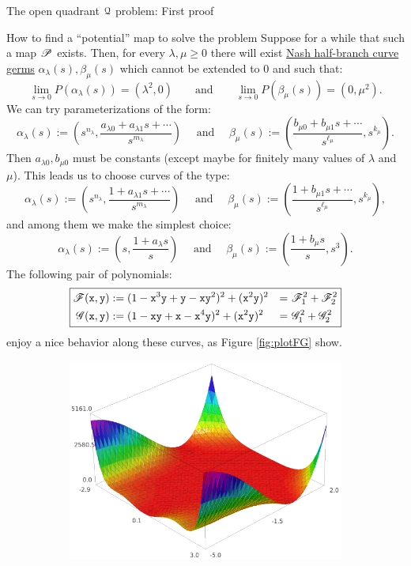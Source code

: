 \documentclass[11pt, a4paper, english, twoside, notitlepage, openright]{report}
\begin{document}
\begin{chapter}{The open quadrant $\Qu$ problem: First proof}
\begin{section}{How to find a ``potential'' map to solve the problem}
Suppose for a while that such a map $\P$ exists. Then, for every $\lambda,\mu\ge 0$ there will exist \hyperref[curveGerms]{Nash half-branch curve germs} $\alpha_{\lambda}(s),\beta_{\mu}(s)$ which cannot be extended to $0$ and such that:
$$
\lim_{s\rightarrow 0} P(\alpha_{\lambda}(s))=(\lambda^2,0)\qquad \text{and} \qquad \lim_{s\rightarrow 0} P(\beta_{\mu}(s))=(0,\mu^2).
$$
We can try parameterizations of the form:
$$
\alpha_{\lambda}(s):=\left(s^{n_{\lambda}},\frac{a_{\lambda 0}+a_{\lambda 1}s+\cdots}{s^{m_{\lambda}}}\right)
\quad \text{ and } \quad
\beta_{\mu}(s):=\left(\frac{b_{\mu 0}+b_{\mu 1}s+\cdots}{s^{\ell_{\mu}}},s^{k_{\mu}}\right).
$$
Then $a_{\lambda 0},b_{\mu 0}$ must be constants (except maybe for finitely many values of $\lambda$ and $\mu$). This leads us to choose curves of the type:
$$
\alpha_{\lambda}(s):=\left(s^{n_{\lambda}},\frac{1+a_{\lambda 1}s+\cdots}{s^{m_{\lambda}}}\right)
\quad \text{ and } \quad
\beta_{\mu}(s):=\left(\frac{1+b_{\mu 1}s+\cdots}{s^{\ell_{\mu}}},s^{k_{\mu}}\right),
$$
and among them we make the simplest choice: 
$$
\alpha_{\lambda}(s):=\left(s,\frac{1+a_{\lambda }s}{s}\right)
\quad \text{ and } \quad
\beta_{\mu}(s):=\left(\frac{1+b_{\mu }s}{s},s^{3}\right).
$$
The following pair of polynomials:
\begin{equation*}\label{eq:firstMap}
\boxed{
\begin{aligned}
\F({\tt x},{\tt y})&:=(1-{\tt x}^3{\tt y}+{\tt y}-{\tt x}{\tt y}^2)^2+({\tt x}^2{\tt y})^2&=&\ \F_1^2+\F_2^2 \\
\G({\tt x},{\tt y})&:=(1-{\tt x}{\tt y}+{\tt x}-{\tt x}^4{\tt y})^2+({\tt x}^2{\tt y})^2&=&\ \G_1^2+\G_2^2\\
\end{aligned}
}
\end{equation*}
enjoy a nice behavior along these curves, as Figure \ref{fig:plotFG} show.
\begin{figure}[h]\hspace{-0.15cm}
\begin{subfigure}{.49\linewidth}\centering
\includegraphics[width=1\textwidth]{plots/ch1_04_F.png}

\end{subfigure}
\end{figure}
\end{section}
\end{chapter}
\end{document}
